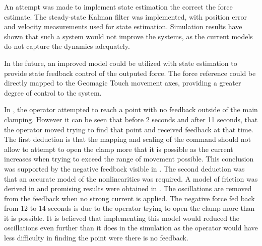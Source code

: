 An attempt was made to implement state estimation the correct the force estimate.
The steady-state Kalman filter was implemented, with position error and velocity measurements used for state estimation.
Simulation results have shown that such a system would not improve the systems, as the current models do not capture the dynamics adequately.

In the future, an improved model could be utilized with state estimation to provide state feedback control of the outputed force.
The force reference could be directly mapped to the Geomagic Touch movement axes, providing a greater degree of control to the system.

In , the operator attempted to reach a point with no feedback outside of the main clamping. However it can be seen that before 2 seconds and after 11 seconds, that the operator moved trying to find that point and received feedback at that time. The first deduction is that the mapping and scaling of the command should not allow to attempt to open the clamp more that it is possible as the current increases when trying to exceed the range of movement possible. This conclusion was supported by the negative feedback visible in . The second deduction was that an accurate model of the nonlinearities was required. 
A model of friction was derived in  and promising results were obtained in . The oscillations are removed from the feedback when no strong current is applied. The negative force fed back from 12 to 14 seconds is due to the operator trying to open the clamp more than it is possible. It is believed that implementing this model would reduced the oscillations even further than it does in the simulation as the operator would have less difficulty in finding the point were there is no feedback.

